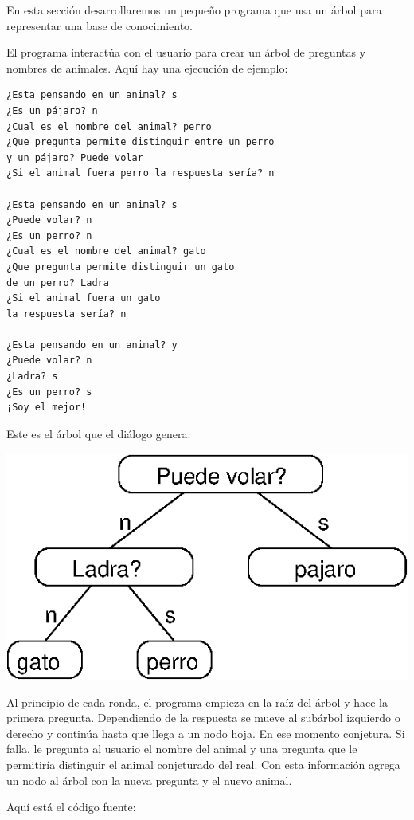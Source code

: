 En esta sección desarrollaremos un pequeño programa que usa un 
árbol para representar una base de conocimiento.

El programa interactúa con el usuario para crear un  árbol de
preguntas y nombres de animales. Aquí hay una ejecución de 
ejemplo:


\beforeverb
\begin{verbatim}
¿Esta pensando en un animal? s
¿Es un pájaro? n
¿Cual es el nombre del animal? perro
¿Que pregunta permite distinguir entre un perro 
y un pájaro? Puede volar
¿Si el animal fuera perro la respuesta sería? n

¿Esta pensando en un animal? s
¿Puede volar? n
¿Es un perro? n
¿Cual es el nombre del animal? gato
¿Que pregunta permite distinguir un gato 
de un perro? Ladra
¿Si el animal fuera un gato 
la respuesta sería? n

¿Esta pensando en un animal? y
¿Puede volar? n
¿Ladra? s
¿Es un perro? s
¡Soy el mejor!

\end{verbatim}
\afterverb
%
Este es el árbol que el diálogo genera:

\beforefig
\centerline{\includegraphics{illustrations/tree5.eps}}
\afterfig

Al principio de cada ronda, el programa empieza en la raíz del árbol
y hace la primera pregunta. Dependiendo de la respuesta se mueve
al subárbol izquierdo o derecho y continúa hasta que llega a un nodo
hoja. En ese momento conjetura. Si falla, le pregunta al usuario el 
nombre del animal y una pregunta que le permitiría distinguir el 
animal conjeturado del real. Con esta información agrega un nodo al
árbol con la nueva pregunta y el nuevo animal.

Aquí está el código fuente:


